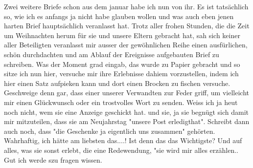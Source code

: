 \def\day{15. M\"{a}rz 1943}
\mktitle

Zwei weitere Briefe schon aus dem januar habe ich nun von ihr.
Es ist tats\"{a}chlich so, wie ich es anfangs ja nicht habe glauben wollen und was auch eben jenen harten Brief haupts\"{a}chlich veranlasst hat.
Trotz aller frohen Stunden, die die Zeit um Weihnachten herum f\"{u}r sie und unsere Eltern gebracht hat, sah sich keiner aller Beteiligten veranlasst mir ausser der gew\"{o}hnlichen Reihe einen ausf\"{u}rlichen, sch\"{o}n durchdachten und am Ablauf der Ereignisse aufgebauten Brief zu schreiben.
Was der Moment grad eingab, das wurde zu Papier gebracht und so sitze ich nun hier, versuche mir ihre Erlebnisse dahiem vorzustellen, indem ich hier einen Satz aufpieken kann und dort einen Brocken zu fischen versuche.
Geschweige denn gar, dass einer unserer Verwandten zur Feder griff, um vielleicht mir einen Gl\"{u}ckwunsch oder ein trostvolles Wort zu senden.
Weiss ich ja heut noch nicht, wem sie eine Anzeige geschickt hat.
und sie, ja sie begn\"{u}gt sich damit mir mitzuteilen, dass sie am Neujahrstag "unsere Post erledigthat".
Schreibt dann auch noch, dass "die Geschenke ja eigentlich uns zusammen" geh\"{o}rten.
Wahrhaftig, ich h\"{a}tte am liebsten das....!
Ist denn das das Wichtigste?
Und auf alles, was sie sonst erlebt, die eine Redewendung, "sie wird mir alles erz\"{a}hlen.. Gut ich werde szu fragen wissen.
\clearpage
